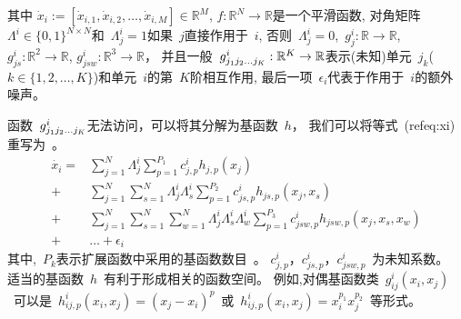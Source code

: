 其中 $\dot{x}_i :=[\dot{x}_{i,1}, \dot{x}_{i,2},\ldots,\dot{x}_{i,M}]\in \mathbb{R}^M$,
$f:\mathbb{R}^N \to \mathbb{R}$是一个平滑函数, 
对角矩阵~$\Lambda^i \in \{0,1\}^{N \times N}$和~$\Lambda^i_{j}=1$如果~$j$直接作用于~$i$, 
否则~$\Lambda^i_{j}=0$,~$g^i_j:\mathbb{R} \to \mathbb{R}$, $g^i_{js}:\mathbb{R}^2 \to \mathbb{R}$, $g^i_{jsw}:\mathbb{R}^3 \to \mathbb{R}$，
并且一般~$g^i_{j_{1}j_{2}\ldots\\j_{K}}:\mathbb{R}^K \to \mathbb{R}$表示(未知)单元~$j_k$($k \in \{1,2,\ldots,K\}$)和单元~$i$的第~$K$阶相互作用, 
最后一项~$\epsilon_{i}$代表于作用于~$i$的额外噪声。

函数~$g^i_{j_{1}j_{2}\ldots\\j_{K}}$无法访问，可以将其分解为基函数~$h$，
我们可以将等式~(ref{eq:xi})重写为~\cite{casadiego2017model}。
\begin{equation}
\label{eq:xi_with_h}
\begin{split}
\dot{x_i} =  &\sum_{j=1}^{N} \Lambda^i_{j} \sum_{p=1}^{P_1} c^i_{j,p}h_{j,p}(x_j) \\
+ &  \sum_{j=1}^{N} \sum_{s=1}^{N}\Lambda^i_{j}\Lambda^i_{s} \sum_{p=1}^{P_2} c^i_{js,p}h_{js,p}(x_j,x_s) \\
                             + &\sum_{j=1}^{N} \sum_{s=1}^{N} \sum_{w=1}^{N}\Lambda^i_{j}\Lambda^i_{s}\Lambda^i_{w} \sum_{p=1}^{P_3} c^i_{jsw,p}h_{jsw,p}(x_j,x_s,x_w)\\
                             + &\ldots + \epsilon_{i} 
\end{split}
\end{equation}
其中,~$P_k$表示扩展函数中采用的基函数数目~\cite{friedman2001elements}。
$c^i_{j,p}$，$c^i_{js,p}$，$c^i_{jsw,p}$~为未知系数。
适当的基函数~$h$~有利于形成相关的函数空间。
例如,对偶基函数类~$g^i_{ij}(x_i,x_j)$~可以是~$h^i_{ij,p}(x_i,x_j)=(x_j-x_i)^p$~或~$h^i_{ij,p}(x_i,x_j)=x^{p_{1}}_i x^{p_{2}}_j$~等形式。


